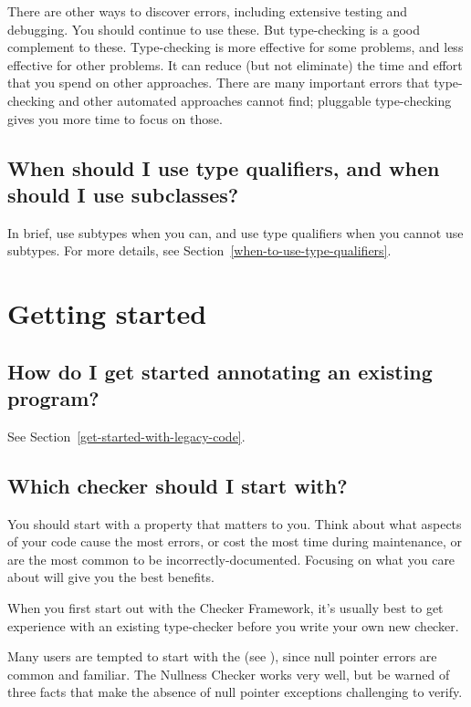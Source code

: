 There are other ways to discover errors, including extensive testing and
debugging.  You should continue to use these.
But type-checking is a good complement to these.  Type-checking is more
effective for some problems, and less effective for other problems.  It can
reduce (but not eliminate) the time and effort that you spend on other
approaches.  There are many important errors that type-checking and other
automated approaches cannot find; pluggable type-checking gives you more
time to focus on those.


\subsection{When should I use type qualifiers, and when should I use subclasses?\label{faq-qualifiers-vs-subclasses}}

In brief, use subtypes when you can, and use type qualifiers when you cannot
use subtypes.
For more details, see Section~\ref{when-to-use-type-qualifiers}.



\section{Getting started\label{faq-getting-started-section}}

\subsection{How do I get started annotating an existing program?\label{faq-annotate-existing-program}}

See Section~\ref{get-started-with-legacy-code}.


\subsection{Which checker should I start with?\label{faq-first-checker}}

You should start with a property that matters to you.  Think about what
aspects of your code cause the most errors, or cost the most time during
maintenance, or are the most common to be incorrectly-documented.  Focusing
on what you care about will give you the best benefits.

When you first start out with the Checker Framework, it's usually best to
get experience with an existing type-checker before you write your own new
checker.

Many users are tempted to start with the
 (see
), since null pointer errors are common
and familiar.  The Nullness Checker works very well, but be warned of three
facts that make the absence of null pointer exceptions challenging to
verify.


